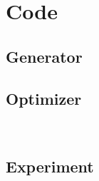 \documentclass[12pt]{article}
\begin{document}
\section*{Code}%
\label{sec:Code}
\subsection*{Generator}


\subsection*{Optimizer}
\\

\subsection*{Experiment}
\end{document}
